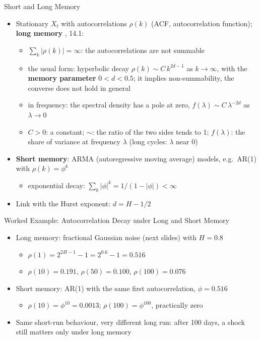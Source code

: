 \begin{frame}{Short and Long Memory}
\itemsize{\small}
\begin{itemize}
    \item Stationary $X_t$ with autocorrelations $\rho(k)$ (ACF, autocorrelation function); \textbf{long memory} , 14.1:
    \begin{itemize}
        \item $\sum_{k} |\rho(k)| = \infty$: the autocorrelations are not summable
        \item the usual form: hyperbolic decay $\rho(k) \sim C\,k^{2d - 1}$ as $k \to \infty$, with the \textbf{memory parameter} $0 < d < 0.5$; it implies non-summability, the converse does not hold in general
        \item in frequency: the spectral density has a pole at zero, $f(\lambda) \sim C\,\lambda^{-2d}$ as $\lambda \to 0$
        \item $C > 0$: a constant; $\sim$: the ratio of the two sides tends to 1; $f(\lambda)$: the share of variance at frequency $\lambda$ (long cycles: $\lambda$ near 0)
    \end{itemize}
    \item \textbf{Short memory}: ARMA (autoregressive moving average) models, e.g.\ AR(1) with $\rho(k) = \phi^k$
    \begin{itemize}
        \item exponential decay: $\sum_k |\phi|^k = 1/(1 - |\phi|) < \infty$
    \end{itemize}
    \item Link with the Hurst exponent: $d = H - 1/2$
\end{itemize}
\end{frame}

\begin{frame}{Worked Example: Autocorrelation Decay under Long and Short Memory}
\itemsize{\small}
\begin{itemize}
    \item Long memory: fractional Gaussian noise (next slides) with $H = 0.8$
    \begin{itemize}
        \item $\rho(1) = 2^{2H - 1} - 1 = 2^{0.6} - 1 = 0.516$
        \item $\rho(10) = 0.191$, $\rho(50) = 0.100$, $\rho(100) = 0.076$
    \end{itemize}
    \item Short memory: AR(1) with the same first autocorrelation, $\phi = 0.516$
    \begin{itemize}
        \item $\rho(10) = \phi^{10} = 0.0013$; $\rho(100) = \phi^{100}$, practically zero
    \end{itemize}
    \item Same short-run behaviour, very different long run: after 100 days, a shock still matters only under long memory
\end{itemize}
\end{frame}

